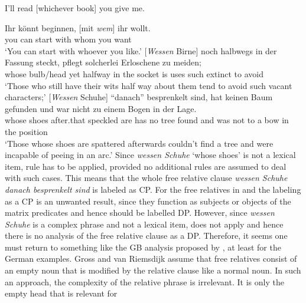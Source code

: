 \ea
I'll read [whichever book] you give me.
\z

\eal
 \ex 
\gll Ihr könnt beginnen, [mit  \emph{wem}] ihr wollt.\footnotemark\\
     you can    start    \hspaceThis{[}with whom you want\\
\glt `You can start with whoever you like.'
\ex 
\gll {}[\emph{Wessen}      Birne]    noch halbwegs in der Fassung steckt, pflegt solcherlei Erloschene zu meiden;\footnotemark\\
       \hspaceThis{[}whose bulb/head yet  halfway  in the socket  is      uses  such       extinct    to avoid\\
\glt `Those who still have their wits half way about them tend to avoid such vacant characters;'
\ex 
\gll {}[\emph{Wessen} Schuhe] "`danach"'  besprenkelt sind, hat keinen Baum gefunden und war nicht zu einem Bogen in der Lage.\footnotemark\\
       \hspaceThis{[}whose    shoes   after.that speckled    are   has no     tree found    and was not   to a     bow   in the position\\
\glt `Those whose shoes are spattered afterwards couldn't find a tree and were incapable of peeing in an arc.'
\zl
%
Since \emph{wessen Schuhe} `whose shoes' is not a lexical item, rule  has to be
applied, provided no additional rules are assumed to deal with such cases. This means that the whole
free relative clause \emph{wessen Schuhe danach besprenkelt sind} is labeled as CP. For the free
relatives in  and  the labeling as a CP is an unwanted result, since they
function as subjects or objects of the matrix predicates and hence should be labelled DP. However,
since \emph{wessen Schuhe} is a complex phrase and not a lexical item,  does not apply
and hence there is no analysis of the free relative clause as a DP. Therefore, it seems one must return to something like the GB analysis proposed by \citet{GR81}, at least for the German
examples. Gross and van Riemsdijk assume that free relatives consist of an empty noun that is
modified by the relative clause like a normal noun. In such an approach, the complexity of the relative phrase is irrelevant. It is only the empty head that is relevant for
